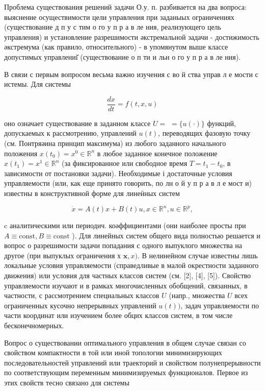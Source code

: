 \documentclass[10pt]{article}
\begin{document}
Проблема существования решений задачи О.у. п. разбивается на два вопроса: выяснение осуществимости цели управления при заданыых ограничениях (существование д п у с тим о го у п р а в ле ния, реализующего цель управления) и установление разрешимости әкстремальной задачи - достижимость әкстремума (как правило, относительного) - в упомянутом выше классе допустимых управлениі̆ (существование о п ти и льн о го у п р а в ле ния).

В связи с первым вопросом весьма важно изучения с во й ства управ л е мости с истемы. Для системы

\[
\frac{d x}{d t}=f(t, x, u)
\]

оно означает существование в заданном классе $U=$ $=\{u(\cdot)\}$ функций, допускаемых к рассмотрению, управлений $u(t)$, переводящих фазовую точку (см. Понтряәина принцип максимума) из любого заданного начального положения $x\left(t_{0}\right)=x^{0} \in \mathbb{R}^{n}$ в любое заданное конечное положение $x\left(t_{1}\right)=x^{1} \in \mathbb{R}^{n}$ (за фиксированное или свободное время $T=t_{1}-t_{0}$, в зависимости от постановки задачи). Необходимые і достаточные условия управляемости (или, как еще принято говорить, по лн о й у п р а в л е мост и) известны в конструктивной форме для линеӥных систем

\[
\dot{x}=A(t) x+B(t) u, x \in \mathbb{R}^{n}, u \in \mathbb{R}^{p},
\]

c аналитическими или периодич. коәффициентами (они наиболее просты при $A \equiv \mathrm{const}, B \equiv \mathrm{const}$ ). Для линейных систем общего вида полностью решается и вопрос о разрешимости задачи попадания с одного выпуклого множества на другое (при выпуклых ограничения х $\mathbf{x}, x)$. В нелинейном случае известны лишь локальные условия управляемости (справедливые в малой окрестности заданного движения) или условия для частных классов систем (см. [2], [4], [5]). Свойство управляемости изучают и в рамках многочисленных обобщений, связанных, в частности, с рассмотрением специальных классов $U$ (напр., множества $U$ всех ограниченных кусочно непрерывных управлений $u(t))$, задач управляемости по части координат или изучением более обцих классов систем, в том числе бесконечномерных.

Вопрос о существовании оптимального управления в общем случае связан со свойством компактности в той или иной топологии минимизирующих последовательностей управлений или траекторий и свойством полунепрерывности по соответствующим переменным минимизируемых функционалов. Первое из этих свойств тесно связано для системы
\end{document}
